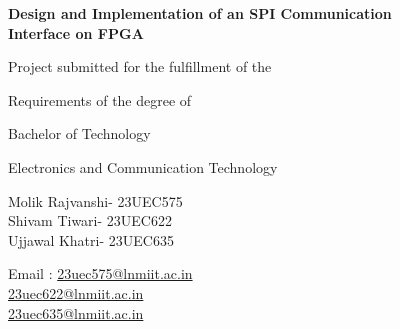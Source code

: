\documentclass[12pt,a4paper]{report}
\begin{document}
\begin{titlepage}
  \centering
  \vspace*{1.5cm}

  {\LARGE\bfseries
    Design and Implementation of an SPI Communication\\[6pt]
    Interface on FPGA\par}

  \vspace{1.2cm}

  {\normalsize Project submitted for the fulfillment of the\par}
  \vspace{0.3cm}
  {\normalsize Requirements of the degree of\par}

  \vspace{0.8cm}

  {\normalsize Bachelor of Technology\par}
  \vspace{0.2cm}
  {\normalsize Electronics and Communication Technology\par}

  \vspace{1.2cm}

  {\normalsize
    Molik Rajvanshi- 23UEC575\\[3pt]
    Shivam Tiwari- 23UEC622\\[3pt]
    Ujjawal Khatri- 23UEC635\par}

  \vspace{0.5cm}

  {\normalsize
    Email :
    \href{mailto:23uec575@lnmiit.ac.in}{23uec575@lnmiit.ac.in}\\[2pt]
    \phantom{Email :\ }
    \href{mailto:23uec622@lnmiit.ac.in}{23uec622@lnmiit.ac.in}\\[2pt]
    \phantom{Email :\ }
    \href{mailto:23uec635@lnmiit.ac.in}{23uec635@lnmiit.ac.in}\par}

  \vspace{1.2cm}


\end{titlepage}
\end{document}
